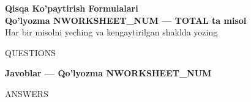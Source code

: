 \documentclass[12pt]{article}
\begin{document}
\begin{center}
\textbf{\LARGE Qisqa Ko'paytirish Formulalari} \\[0.3cm]
\textbf{\large Qo'lyozma N{{WORKSHEET_NUM}} --- {{TOTAL}} ta misol} \\[0.2cm]
\normalsize Har bir misolni yeching va kengaytirilgan shaklda yozing
\end{center}

\vspace{0.5cm}

{{QUESTIONS}}

\newpage

\begin{center}
\textbf{\LARGE Javoblar --- Qo'lyozma N{{WORKSHEET_NUM}}}
\end{center}

\vspace{0.5cm}

{{ANSWERS}}
\end{document}
